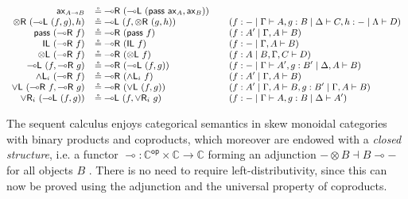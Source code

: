 \documentclass[submission,copyright,creativecommons]{eptcs}
\theoremstyle{definition}
\newcommand{\tl}{\otimes \mathsf{L}}
\newcommand{\tr}{\otimes \mathsf{R}}
\newcommand{\lright}{{\multimap}\mathsf{R}}
\newcommand{\lleft}{{\multimap}\mathsf{L}}
\newcommand{\pass}{\mathsf{pass}}
\newcommand{\unitl}{\mathsf{IL}}
\newcommand{\andlone}{\land \mathsf{L}_{1}}
\newcommand{\andltwo}{\land \mathsf{L}_{2}}
\newcommand{\andli}{\land \mathsf{L}_{i}}
\newcommand{\orl}{\lor \mathsf{L}}
\newcommand{\orrone}{\lor \mathsf{R}_{1}}
\newcommand{\orrtwo}{\lor \mathsf{R}_{2}}
\newcommand{\orri}{\lor \mathsf{R}_{i}}
\newcommand{\ax}{\mathsf{ax}}
\newcommand{\ot}{\otimes}
\newcommand{\lolli}{\multimap}
\begin{document}
\begin{equation*}\label{fig:circeq:impl}
  \small
  \begin{array}{rlll}
  \ax_{A \lolli B} &\circeq \lright \text{ } (\lleft \text{ } (\pass \text{ } \ax_{A}, \ax_{B} ))
  \\
  \tr \text{ } (\lleft \text{ } (f , g), h) & \circeq \lleft \text{ } (f, \tr \text{ } (g, h)) &&(f: {-} \mid \Gamma \vdash A, g : B \mid \Delta \vdash C, h : {-} \mid \Lambda \vdash D)
  \\
  \pass \text{ } (\lright \text{ } f) &\circeq  \lright \text{ } (\pass \text{ } f) &&(f : A' \mid \Gamma , A \vdash B)
  \\
  \unitl \text{ } (\lright \text{ } f) &\circeq \lright \text{ } (\unitl \text{ } f) &&(f : {-} \mid \Gamma , A \vdash B)
  \\
  \tl \text{ } (\lright \text{ } f) &\circeq \lright \text{ } (\tl \text{ } f) &&(f : A \mid B , \Gamma , C \vdash D)
  \\
  \lleft \text{ } (f, \lright \text{ } g) &\circeq \lright \text{ } (\lleft \text{ } (f, g)) &&(f : {-} \mid \Gamma \vdash A', g : B' \mid \Delta , A \vdash B)
  \\
  \andli \ (\lright \ f) &\circeq \lright \ (\andli \ f) &&(f : A' \mid \Gamma , A \vdash B)
  \\
  \orl \ (\lright \ f , \lright \ g) &\circeq \lright \ (\orl \ (f ,g)) &&(f : A' \mid \Gamma , A \vdash B , g : B' \mid \Gamma , A \vdash B)
  \\
  \orri \ (\lleft \  (f , g)) &\circeq \lleft \ (f , \orri \ g) &&(f : - \mid \Gamma \vdash A , g : B \mid \Delta \vdash A')
  \end{array}
\end{equation*}

The sequent calculus enjoys categorical semantics in skew monoidal categories with binary products and coproducts, which moreover are endowed with a \emph{closed structure}, i.e. a functor $\lolli : \mathbb{C}^{\mathsf{op}} \times \mathbb{C} \rightarrow \mathbb{C}$ forming an adjunction ${-} \ot B \dashv B \lolli {-}$ for all objects $B$ \cite{street:skew-closed:2013}. There is no need to require left-distributivity, since this can now be proved using the adjunction and the universal property of coproducts.
\end{document}
